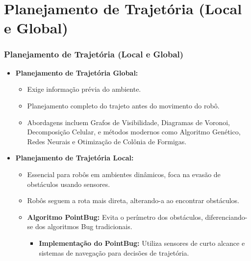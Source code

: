 \documentclass[xcolor=dvipsnames, aspectratio=169]{beamer}
\begin{document}
\section{Planejamento de Trajetória (Local e Global)}
\begin{frame}[fragile]
  \frametitle{Planejamento de Trajetória (Local e Global)}
  \begin{itemize}
    \item \textbf{Planejamento de Trajetória Global:} 
    \begin{itemize}
        \item Exige informação prévia do ambiente.
        \item Planejamento completo do trajeto antes do movimento do robô.
        \item Abordagens incluem Grafos de Visibilidade, Diagramas de Voronoi, Decomposição Celular, e métodos modernos como Algoritmo Genético, Redes Neurais e Otimização de Colônia de Formigas.
    \end{itemize}
    \item \textbf{Planejamento de Trajetória Local:}
    \begin{itemize}
      \item Essencial para robôs em ambientes dinâmicos, foca na evasão de obstáculos usando sensores.
      \item Robôs seguem a rota mais direta, alterando-a ao encontrar obstáculos.
      \item \textbf{Algoritmo PointBug:} Evita o perímetro dos obstáculos, diferenciando-se dos algoritmos Bug tradicionais.
      \begin{itemize}
        \item \textbf{Implementação do PointBug:} Utiliza sensores de curto alcance e sistemas de navegação para decisões de trajetória.
      \end{itemize}
    \end{itemize}
  \end{itemize}

\end{frame}
\end{document}
